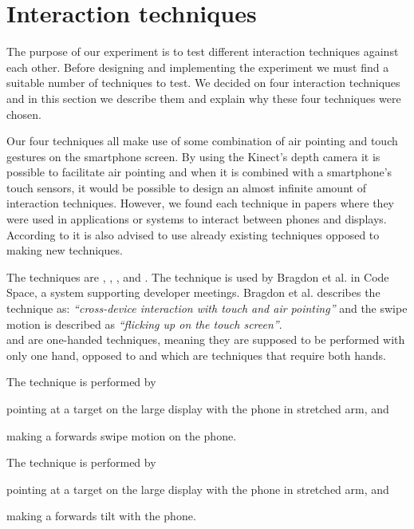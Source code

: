 \section{Interaction techniques}
The purpose of our experiment is to test different interaction techniques against each other.
Before designing and implementing the experiment we must find a suitable number of techniques to test. 
We decided on four interaction techniques and in this section we describe them and explain why these four techniques were chosen.

Our four techniques all make use of some combination of air pointing and touch gestures on the smartphone screen.
By using the Kinect's depth camera it is possible to facilitate air pointing and when it is combined with a smartphone's touch sensors, it would be possible to design an almost infinite amount of interaction techniques.
However, we found each technique in papers where they were used in applications or systems to interact between phones and displays. 
According to \cite{} it is also advised to use already existing techniques opposed to making new techniques.

The techniques are \swipe, \tilt, \throw, and \pinch.
The \swipe technique is used by Bragdon et al. \cite{Bragdon:2011} in Code Space, a system supporting developer meetings. 
Bragdon et al. describes the technique as: \emph{``cross-device interaction with touch and air pointing''} and the swipe motion is described as \emph{``flicking up on the touch screen''}. \\
 
\swipe and \tilt are one-handed techniques, meaning they are supposed to be performed with only one hand, opposed to \throw and \pinch which are techniques that require both hands.

The \swipe technique is performed by 
\begin{enumerate*}[label=\itshape\arabic*\upshape)]
	\item{pointing at a target on the large display with the phone in stretched arm, and}
	\item{making a forwards swipe motion on the phone.}
\end{enumerate*}

The \tilt technique is performed by 
\begin{enumerate*}[label=\itshape\arabic*\upshape)]
	\item{pointing at a target on the large display with the phone in stretched arm, and}
	\item{making a forwards tilt with the phone.}
\end{enumerate*}

